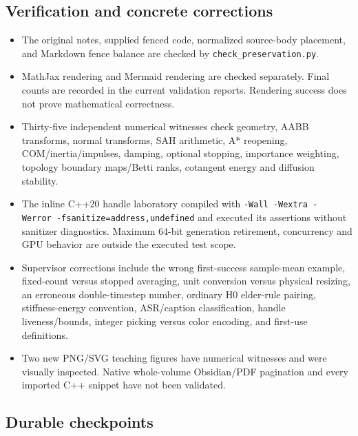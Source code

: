 \subsection{Verification and concrete corrections}\label{appendix-3b67654799a2-verification-and-concrete-corrections}

\begin{itemize}
\tightlist
\item
  The original notes, supplied fenced code, normalized source-body placement, and Markdown fence balance are checked by \texttt{check\_preservation.py}.
\item
  MathJax rendering and Mermaid rendering are checked separately. Final counts are recorded in the current validation reports. Rendering success does not prove mathematical correctness.
\item
  Thirty-five independent numerical witnesses check geometry, AABB transforms, normal transforms, SAH arithmetic, A* reopening, COM/inertia/impulses, damping, optional stopping, importance weighting, topology boundary maps/Betti ranks, cotangent energy and diffusion stability.
\item
  The inline C++20 handle laboratory compiled with \texttt{-Wall\ -Wextra\ -Werror\ -fsanitize=address,undefined} and executed its assertions without sanitizer diagnostics. Maximum 64-bit generation retirement, concurrency and GPU behavior are outside the executed test scope.
\item
  Supervisor corrections include the wrong first-success sample-mean example, fixed-count versus stopped averaging, unit conversion versus physical resizing, an erroneous double-timestep number, ordinary H0 elder-rule pairing, stiffness-energy convention, ASR/caption classification, handle liveness/bounds, integer picking versus color encoding, and first-use definitions.
\item
  Two new PNG/SVG teaching figures have numerical witnesses and were visually inspected. Native whole-volume Obsidian/PDF pagination and every imported C++ snippet have not been validated.
\end{itemize}

\subsection{Durable checkpoints}\label{appendix-3b67654799a2-durable-checkpoints}

